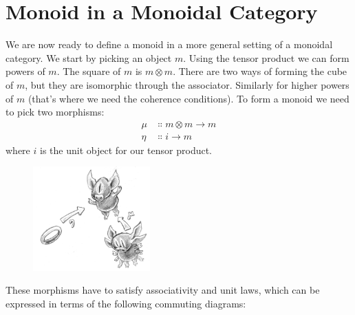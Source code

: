 \section{Monoid in a Monoidal Category}

We are now ready to define a monoid in a more general setting of a
monoidal category. We start by picking an object $m$. Using the
tensor product we can form powers of $m$. The square of
$m$ is $m \otimes m$. There are two ways of forming the cube
of $m$, but they are isomorphic through the associator. Similarly
for higher powers of $m$ (that's where we need the coherence
conditions). To form a monoid we need to pick two morphisms:
\begin{align*}
\mu &\Colon m \otimes m \to m \\
\eta &\Colon i \to m
\end{align*}
where $i$ is the unit object for our tensor product.

\begin{figure}[H]
\centering
\includegraphics[width=0.4\textwidth]{images/monoid-1.jpg}
\end{figure}

\noindent
These morphisms have to satisfy associativity and unit laws, which can
be expressed in terms of the following commuting diagrams:

\begin{figure}[H]
\centering
{}
\end{figure}

\begin{figure}[H]
\centering
{}
\end{figure}

